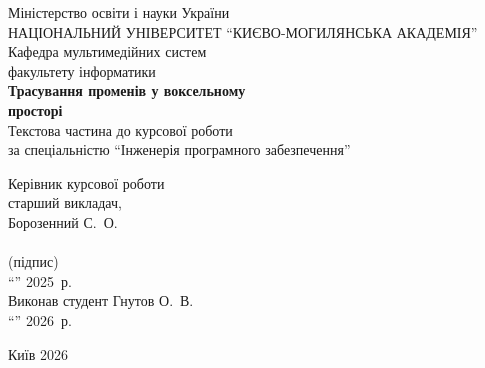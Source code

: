 \begin{titlepage}
    \begin{center}
        {\large Міністерство освіти і науки України}\\[1em]
        {\large НАЦІОНАЛЬНИЙ УНІВЕРСИТЕТ ``КИЄВО-МОГИЛЯНСЬКА АКАДЕМІЯ''}\\[0em]
        {\large Кафедра мультимедійних систем\\факультету інформатики}\\[4em]
        
        {\Large \textbf{Трасування променів у воксельному\\просторі}}\\[4em]
        
        {\large Текстова частина до курсової роботи\\[0.5em]
        за спеціальністю ``Інженерія програмного забезпечення''}\\[4em]
        
        \begin{flushright}
        Керівник курсової роботи\\
        старший викладач,\\
        Борозенний С.~О.\\[2em]
        
        \underline{\hspace{4cm}}\\
        (підпис)\\[1em]
        
        ``\underline{\hspace{1cm}}'' \underline{\hspace{3cm}} 2025~р.\\[3em]
        
        Виконав студент Гнутов О.~В.\\[1em]
        ``\underline{\hspace{1cm}}'' \underline{\hspace{3cm}} 2026~р.\\
        \end{flushright}
        
        \vfill
        Київ 2026
    \end{center}
    \newpage
\end{titlepage}